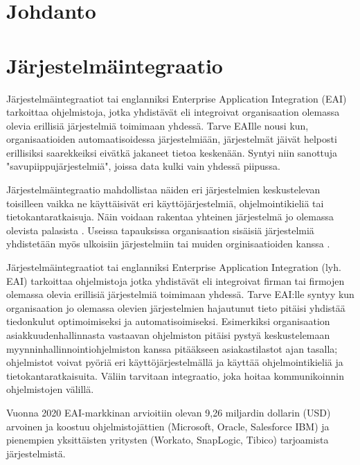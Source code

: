
\chapter{Johdanto}

\chapter{Järjestelmäintegraatio}


Järjestelmäintegraatiot tai englanniksi Enterprise Application Integration (EAI) tarkoittaa ohjelmistoja, jotka yhdistävät eli integroivat organisaation olemassa olevia erillisiä järjestelmiä toimimaan yhdessä. Tarve EAIlle nousi kun, organisaatioiden automaatisoidessa järjestelmiään, järjestelmät jäivät helposti erillisiksi saarekkeiksi eivätkä jakaneet tietoa keskenään. Syntyi niin sanottuja "savupiippujärjestelmiä", joissa data kulki vain yhdessä piipussa. 

Järjestelmäintegraatio mahdollistaa näiden eri järjestelmien keskustelevan toisilleen vaikka ne käyttäisivät eri käyttöjärjestelmiä, ohjelmointikieliä tai tietokantaratkaisuja. Näin voidaan rakentaa yhteinen järjestelmä jo olemassa olevista palasista \cite{linthicum2000enterprise}. Useissa tapauksissa organisaation sisäisiä järjestelmiä yhdistetään myös ulkoisiin järjestelmiin tai muiden orginisaatioiden kanssa \cite{Johannesson2001}.

Järjestelmäintegraatiot tai englanniksi Enterprise Application Integration (lyh. EAI) tarkoittaa
ohjelmistoja jotka yhdistävät eli integroivat firman tai firmojen olemassa olevia erillisiä
järjestelmiä toimimaan yhdessä. Tarve EAI:lle syntyy kun organisaation jo olemassa olevien
järjestelmien hajautunut tieto pitäisi yhdistää tiedonkulut optimoimiseksi ja
automatisoimiseksi. Esimerkiksi organisaation asiakkuudenhallinnasta vastaavan ohjelmiston
pitäisi pystyä keskustelemaan myynninhallinnointiohjelmiston kanssa pitääkseen
asiakastilastot ajan tasalla; ohjelmistot voivat pyöriä eri käyttöjärjestelmällä ja käyttää
ohjelmointikieliä ja tietokantaratkaisuita. Väliin tarvitaan integraatio, joka hoitaa
kommunikoinnin ohjelmistojen välillä.

Vuonna 2020 EAI-markkinan arvioitiin olevan 9,26 miljardin dollarin (USD) arvoinen \citep{mordorintelligence} ja koostuu ohjelmistojättien (Microsoft, Oracle, Salesforce IBM) ja pienempien yksittäisten yritysten (Workato, SnapLogic, Tibico) tarjoamista järjestelmistä.


